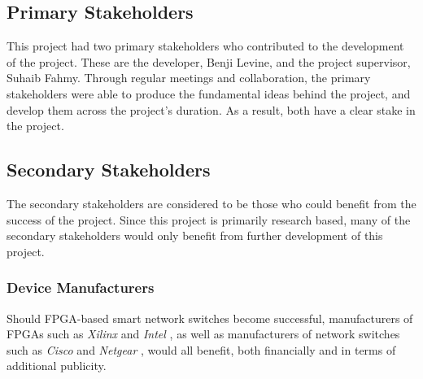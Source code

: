 
\subsection{Primary Stakeholders}
\label{primary_stakeholders}
This project had two primary stakeholders who contributed to the development of the project. These are the developer, Benji Levine, and the project supervisor, Suhaib Fahmy. Through regular meetings and collaboration, the primary stakeholders were able to produce the fundamental ideas behind the project, and develop them across the project's duration. As a result, both have a clear stake in the project.

\subsection{Secondary Stakeholders}
\label{secondary_stakeholders}
The secondary stakeholders are considered to be those who could benefit from the success of the project. Since this project is primarily research based, many of the secondary stakeholders would only benefit from further development of this project.

\subsubsection{Device Manufacturers}
Should FPGA-based smart network switches become successful, manufacturers of FPGAs such as \textit{Xilinx} \cite{xilinx} and \textit{Intel} \cite{intel_fpga}, as well as manufacturers of network switches such as \textit{Cisco} \cite{cisco} and \textit{Netgear} \cite{netgear}, would all benefit, both financially and in terms of additional publicity.

